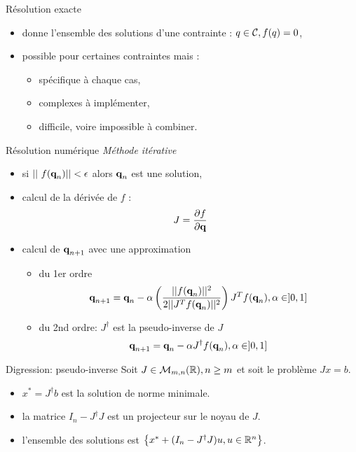 \begin{frame}[<+->]{R\'esolution exacte}
  \begin{itemize}
    \item donne l'ensemble des solutions d'une contrainte : ${ q\in{\cal C}, f(q) = 0}$,
    \item possible pour certaines contraintes mais :
      \begin{itemize}
        \item sp\'ecifique \`a chaque cas,
        \item complexes \`a impl\'ementer,
        \item difficile, voire impossible \`a combiner.
      \end{itemize}
  \end{itemize}
\end{frame}

\begin{frame}[<+->]{R\'esolution num\'erique}
  \emph{M\'ethode it\'erative}
  \begin{itemize}
    \item si $ || f(\conf_n) || < \epsilon $ alors $\textbf{q}_n$ est une solution,
    \item calcul de la d\'eriv\'ee de $f$ :
      $$J = \frac{\partial f}{\partial \textbf{q}}$$
    \item calcul de $\textbf{q}_{n+1}$ avec une approximation
      \begin{itemize}
        \item du 1er ordre
          $$\textbf{q}_{n+1} = \textbf{q}_n - \alpha \left( \frac{||f(\textbf{q}_n)||^2}{2 ||J^T f(\textbf{q}_n)||^2} \right) J^{T} f(\textbf{q}_n), \alpha\in]0,1] $$
        \item du 2nd ordre: $J^{\dagger}$ est la pseudo-inverse de $J$
          $$\textbf{q}_{n+1} = \textbf{q}_n - \alpha J^{\dagger} f(\textbf{q}_n), \alpha\in]0,1] $$
      \end{itemize}
  \end{itemize}
\end{frame}

\begin{frame}[<+->]{Digression: pseudo-inverse}
  Soit $J\in\mathcal{M}_{m,n}(\mathbb{R}), n \ge m$ et soit le probl\`eme 
  $J x = b$.

  \begin{itemize}
    \item $x^* = J^{\dagger} b$ est la solution de norme minimale.
    \item la matrice $I_n - J^\dagger J$ est un projecteur sur le noyau de $J$.
    \item l'ensemble des solutions est $\left\{ x^* + (I_n - J^\dagger J) u, u\in\mathbb{R}^n \right\}$.
  \end{itemize}
\end{frame}

